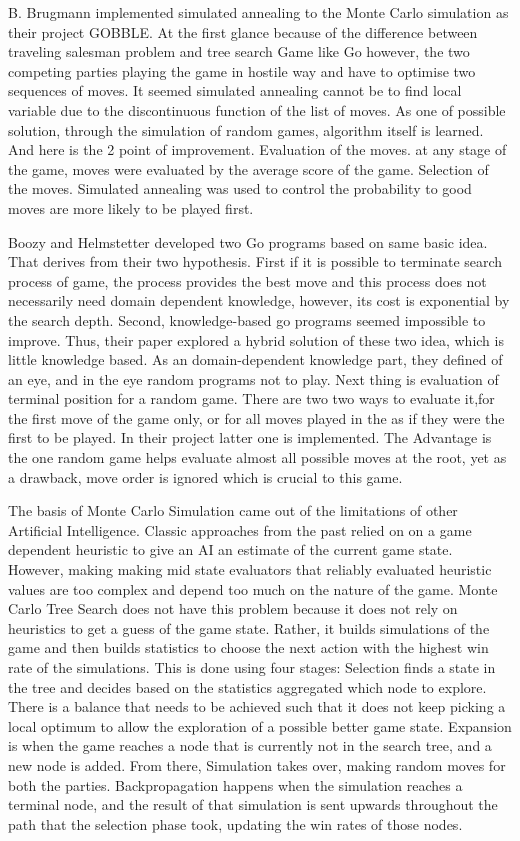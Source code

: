 \documentclass[12pt]{article}
\begin{document}
B. Brugmann implemented simulated annealing to the Monte Carlo simulation as their project GOBBLE\cite{brugmann1993monte}. At the first glance because of the difference between traveling salesman problem and tree search Game like Go however, the two competing parties playing the game in hostile way and have to optimise two sequences of moves. It seemed simulated annealing cannot be to find local variable due to the discontinuous function of the list of moves. As one of possible solution, through the simulation of random games, algorithm itself is learned. And here is the 2 point of improvement. Evaluation of the moves. at any stage of the game, moves were evaluated by the average score of the game. Selection of the moves. Simulated annealing was used to control the probability to good moves are more likely to be played first.


Boozy and Helmstetter developed two Go programs based on same basic idea\cite{bouzy2004monte}. That derives from their two hypothesis. First if it is possible to terminate search process of game, the process provides the best move and this process does not necessarily need domain dependent knowledge, however, its cost is exponential by the search depth. Second, knowledge-based go programs seemed impossible to improve. Thus, their paper explored a hybrid solution of these two idea, which is little knowledge based. As an domain-dependent knowledge part, they defined of an {eye}, and in the {eye} random programs not to play. Next thing is evaluation of terminal position for a random game. There are two two ways to evaluate it,{for the first move of the game only}, or  {for all moves played in the as if they were the first to be played.} In their project latter one is implemented. The Advantage is the one random game helps evaluate almost all possible moves at the root, yet as a drawback, move order is ignored which is crucial to this game. 


The basis of Monte Carlo Simulation came out of the limitations of other Artificial Intelligence. Classic approaches from the past relied on on a game dependent heuristic to give an AI an estimate of the current game state. However, making making mid state evaluators that reliably evaluated heuristic values are too complex and depend too much on the nature of the game. \cite{chaslot2008monte} Monte Carlo Tree Search does not have this problem because it does not rely on heuristics to get a guess of the game state. Rather, it builds simulations of the game and then builds statistics to choose the next action with the highest win rate of the simulations. This is done using four stages: Selection finds a state in the tree and decides based on the statistics aggregated which node to explore. There is a balance that needs to be achieved such that it does not keep picking a local optimum to allow the exploration of a possible better game state. Expansion is when the game reaches a node that is currently not in the search tree, and a new node is added. From there, Simulation takes over, making random moves for both the parties. Backpropagation happens when the simulation reaches a terminal node, and the result of that simulation is sent upwards throughout the path that the selection phase took, updating the win rates of those nodes. 
\end{document}
